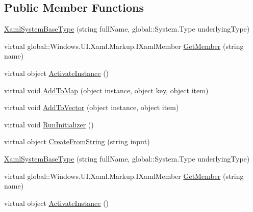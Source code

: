 \subsection*{Public Member Functions}
\begin{DoxyCompactItemize}
\item 
\hyperlink{class_e_l_i_client_1_1_e_l_i_client___xaml_type_info_1_1_xaml_system_base_type_af46ea0fad0966f1ede472ee463183a0d}{Xaml\+System\+Base\+Type} (string full\+Name, global\+::\+System.\+Type underlying\+Type)
\item 
virtual global\+::\+Windows.\+U\+I.\+Xaml.\+Markup.\+I\+Xaml\+Member \hyperlink{class_e_l_i_client_1_1_e_l_i_client___xaml_type_info_1_1_xaml_system_base_type_a4ec754252bc6008baef1bb42484c8971}{Get\+Member} (string name)
\item 
virtual object \hyperlink{class_e_l_i_client_1_1_e_l_i_client___xaml_type_info_1_1_xaml_system_base_type_a3f61df0c415b0904f55ec69f26fc2de9}{Activate\+Instance} ()
\item 
virtual void \hyperlink{class_e_l_i_client_1_1_e_l_i_client___xaml_type_info_1_1_xaml_system_base_type_abd26a6811ca622b1d16bc6b0d0519c2b}{Add\+To\+Map} (object instance, object key, object item)
\item 
virtual void \hyperlink{class_e_l_i_client_1_1_e_l_i_client___xaml_type_info_1_1_xaml_system_base_type_a4c7b8f8e395dc2baec83e13b2520215d}{Add\+To\+Vector} (object instance, object item)
\item 
virtual void \hyperlink{class_e_l_i_client_1_1_e_l_i_client___xaml_type_info_1_1_xaml_system_base_type_a171cdd071c13800c2cd7489b6cfc1010}{Run\+Initializer} ()
\item 
virtual object \hyperlink{class_e_l_i_client_1_1_e_l_i_client___xaml_type_info_1_1_xaml_system_base_type_a0bd52d534da56c352eb100be5f7f400a}{Create\+From\+String} (string input)
\item 
\hyperlink{class_e_l_i_client_1_1_e_l_i_client___xaml_type_info_1_1_xaml_system_base_type_af46ea0fad0966f1ede472ee463183a0d}{Xaml\+System\+Base\+Type} (string full\+Name, global\+::\+System.\+Type underlying\+Type)
\item 
virtual global\+::\+Windows.\+U\+I.\+Xaml.\+Markup.\+I\+Xaml\+Member \hyperlink{class_e_l_i_client_1_1_e_l_i_client___xaml_type_info_1_1_xaml_system_base_type_a4ec754252bc6008baef1bb42484c8971}{Get\+Member} (string name)
\item 
virtual object \hyperlink{class_e_l_i_client_1_1_e_l_i_client___xaml_type_info_1_1_xaml_system_base_type_a3f61df0c415b0904f55ec69f26fc2de9}{Activate\+Instance} ()

\end{DoxyCompactItemize}
